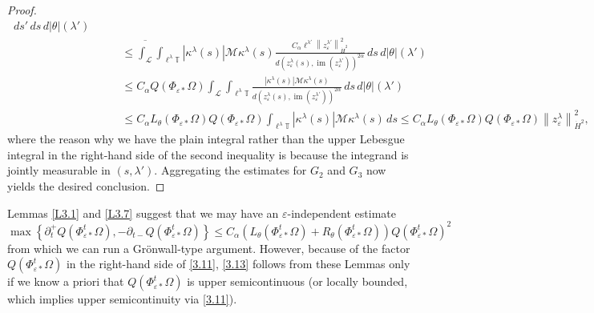 \documentclass[reqno,centertags,12pt]{amsart}
\theoremstyle{definition}
\numberwithin{equation}{section}
\newcommand{\abs}[1]{\left\lvert#1\right\rvert}
\newcommand{\norm}[1]{\left\|#1\right\|}
\newcommand{\set}[1]{\left\{ #1 \right\}}
\newcommand{\bbT}{{\mathbb{T}}}
\newcommand{\eps}{\varepsilon}
\newcommand{\tht}{\theta}
\begin{document}
\begin{proof}
\begin{align*}
        \,ds'\,ds\,d|\theta|(\lambda')
        \\&\quad\quad \leq
        \overline{\int_{\mathcal{L}}}
        \int_{\ell^{\lambda}\bbT}\abs{\kappa^{\lambda}(s)}\mathcal{M}\kappa^{\lambda}(s)
        \frac{C_{\alpha}\ell^{\lambda'}\norm{z_{\eps}^{\lambda'}}_{\dot{H}^{2}}^{2}}
        {d(z_{\eps}^{\lambda}(s), \operatorname{im}(z_{\eps}^{\lambda'}))^{2\alpha}}
        \,ds\,d|\theta|(\lambda')
        \\&\quad\quad \leq
        C_{\alpha}Q(\Phi_{\eps*}\Omega)
        \int_{\mathcal{L}}
        \int_{\ell^{\lambda}\bbT}
        \frac{\abs{\kappa^{\lambda}(s)}\mathcal{M}\kappa^{\lambda}(s)}
        {d(z_{\eps}^{\lambda}(s), \operatorname{im}(z_{\eps}^{\lambda'}))^{2\alpha}}
        \,ds\,d|\theta|(\lambda')
        \\&\quad\quad \leq
        C_{\alpha}L_{\tht}(\Phi_{\eps*}\Omega)Q(\Phi_{\eps*}\Omega)
        \int_{\ell^{\lambda}\bbT}
        \abs{\kappa^{\lambda}(s)}\mathcal{M}\kappa^{\lambda}(s)\,ds
        \leq C_{\alpha}L_{\tht}(\Phi_{\eps*}\Omega)Q(\Phi_{\eps*}\Omega)
        \norm{z_{\eps}^{\lambda}}_{\dot{H}^{2}}^{2},
    \end{align*}
    where the reason why we have the plain integral rather than the upper Lebesgue integral
    in the right-hand side of the second inequality is because
    the integrand is jointly measurable in $(s,\lambda')$.
    Aggregating the estimates for $G_{2}$ and $G_{3}$ now yields the desired conclusion.
\end{proof}

Lemmas \ref{L3.1} and \ref{L3.7} suggest that we may have an $\eps$-independent estimate
\begin{equation}\label{3.13}
    \max\set{\partial_{t}^{+}Q(\Phi_{\eps*}^{t}\Omega),
    -\partial_{t-}Q(\Phi_{\eps*}^{t}\Omega)}
    \leq C_{\alpha}(L_{\tht}(\Phi_{\eps*}^{t}\Omega) + R_{\tht}(\Phi_{\eps*}^{t}\Omega))
    Q(\Phi_{\eps*}^{t}\Omega)^{2}
\end{equation}
from which we can run a Gr\"{o}nwall-type argument. However,
because of the factor $Q(\Phi_{\eps*}^{t}\Omega)$ in the right-hand side of \eqref{3.11},
\eqref{3.13} follows from these Lemmas only if we know a priori that
$Q(\Phi_{\eps*}^{t}\Omega)$ is upper semicontinuous (or locally bounded,
which implies upper semicontinuity via \eqref{3.11}).
\end{document}
